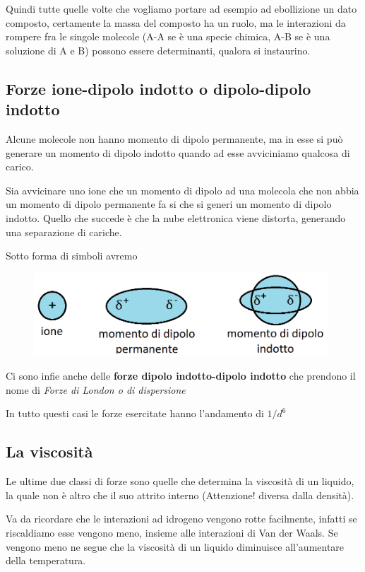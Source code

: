 \vspace{0.2cm}Quindi tutte quelle volte che vogliamo portare ad esempio ad ebollizione un dato composto, certamente la massa del composto ha un ruolo, ma le interazioni da rompere fra le singole molecole (A-A se è una specie chimica, A-B se è una soluzione di A e B) possono essere determinanti, qualora si instaurino.

\subsection{Forze ione-dipolo indotto o dipolo-dipolo indotto}
Alcune molecole non hanno momento di dipolo permanente, ma in esse si può generare un momento di dipolo indotto quando ad esse avviciniamo qualcosa di carico.

Sia avvicinare uno ione che un momento di dipolo ad una molecola che non abbia un momento di dipolo permanente fa si che si generi un momento di dipolo indotto. Quello che succede è che la nube elettronica viene distorta, generando una separazione di cariche.

Sotto forma di simboli avremo

\begin{figure}[htp]
    \centering
    \includegraphics[width=11cm]{immagini/ioni_e_momenti_di_dipolo.png}
\end{figure}

Ci sono infie anche delle \textbf{forze dipolo indotto-dipolo indotto} che prendono il nome di \textit{Forze di London o di dispersione}

In tutto questi casi le forze esercitate hanno l'andamento di $1/d^6$
\subsection{La viscosità}
Le ultime due classi di forze sono quelle che determina la viscosità di un liquido, la quale non è altro che il suo attrito interno (Attenzione! \E diversa dalla densità).

Va da ricordare che le interazioni ad idrogeno vengono rotte facilmente, infatti se riscaldiamo esse vengono meno, insieme alle interazioni di Van der Waals. Se vengono meno ne segue che la viscosità di un liquido diminuisce all'aumentare della temperatura.